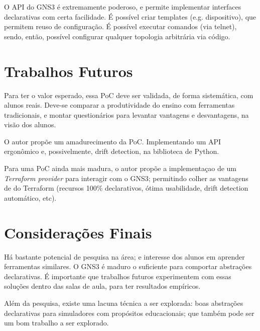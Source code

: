 \documentclass[12pt]{article}
\begin{document}
O API do GNS3 é extremamente poderoso, e permite implementar interfaces
declarativas com certa facilidade. É possível criar templates (e.g.
dispositivo), que permitem reuso de configuração. É possível executar comandos
(via telnet), sendo, então, possível configurar qualquer topologia arbitrária
via código.

\section{Trabalhos Futuros}

Para ter o valor esperado, essa PoC deve ser validada, de forma sistemática,
com alunos reais. Deve-se comparar a produtividade do ensino com ferramentas
tradicionais, e montar questionários para levantar vantagens e desvantagens, na
visão dos alunos.

O autor propõe um amadurecimento da PoC. Implementando um API ergonômico e,
possivelmente, drift detection, na biblioteca de Python.

Para uma PoC ainda mais madura, o autor propõe a implementaçao de um
\textit{Terraform provider} para interagir com o GNS3; permitindo colher as
vantagens de do Terraform (recursos 100\% declarativos, ótima usabilidade,
drift detection automático, etc).

\section{Considerações Finais}

Há bastante potencial de pesquisa na área; e interesse dos alunos em aprender
ferramentas similares. O GNS3 é maduro o suficiente para comportar abstrações
declarativas. É importante que trabalhos futuros experimentem com essas
soluções dentro das salas de aula, para ter resultados empíricos.

Além da pesquisa, existe uma lacuna técnica a ser explorada: boas abstrações
declarativas para simuladores com propósitos educacionais; que também pode ser
um bom trabalho a ser explorado.



\end{document}
